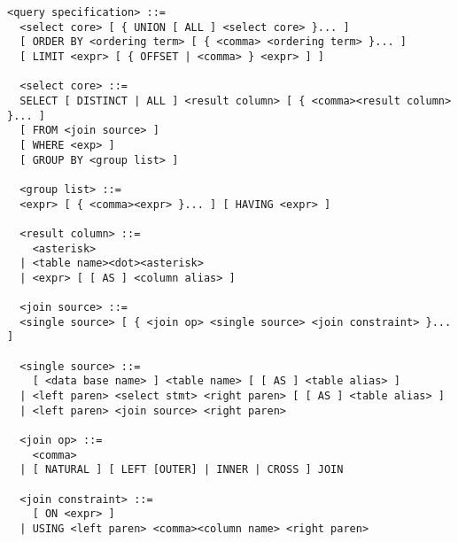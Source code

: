 \begin{Verbatim}[frame=single, label=sintaxis para SELECT]
  <query specification> ::=
  <select core> [ { UNION [ ALL ] <select core> }... ]
  [ ORDER BY <ordering term> [ { <comma> <ordering term> }... ]
  [ LIMIT <expr> [ { OFFSET | <comma> } <expr> ] ]
  
  <select core> ::=
  SELECT [ DISTINCT | ALL ] <result column> [ { <comma><result column> }... ] 
  [ FROM <join source> ]
  [ WHERE <exp> ]
  [ GROUP BY <group list> ]
  
  <group list> ::=
  <expr> [ { <comma><expr> }... ] [ HAVING <expr> ]
  
  <result column> ::=
    <asterisk>
  | <table name><dot><asterisk>
  | <expr> [ [ AS ] <column alias> ]
  
  <join source> ::=
  <single source> [ { <join op> <single source> <join constraint> }... ]
  
  <single source> ::=
    [ <data base name> ] <table name> [ [ AS ] <table alias> ]
  | <left paren> <select stmt> <right paren> [ [ AS ] <table alias> ]
  | <left paren> <join source> <right paren>

  <join op> ::=
    <comma>
  | [ NATURAL ] [ LEFT [OUTER] | INNER | CROSS ] JOIN
  
  <join constraint> ::=
    [ ON <expr> ]
  | USING <left paren> <comma><column name> <right paren>
\end{Verbatim}
